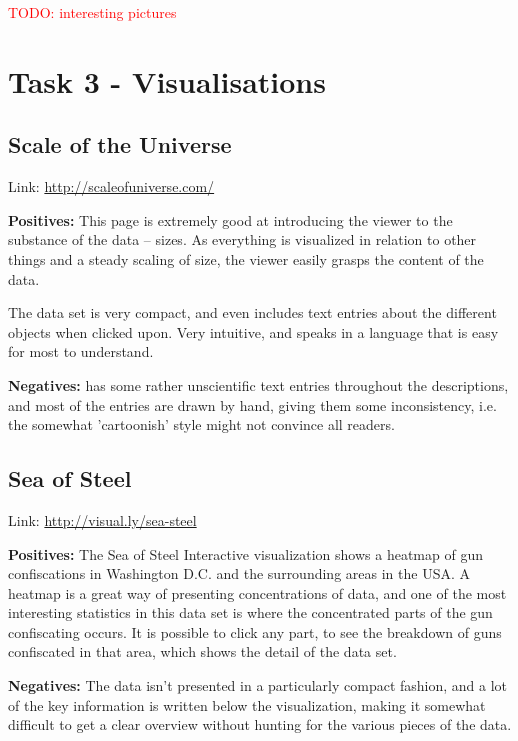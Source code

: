 \documentclass[a4paper]{article}
\newcommand\todo[1]{{\Huge \textcolor{red}{TODO: #1}}}
\begin{document}
\todo{interesting pictures}

\section*{Task 3 - Visualisations}

\subsection*{Scale of the Universe}

Link: \url{http://scaleofuniverse.com/}

\vspace{1em}
\noindent
\textbf{Positives:}
This page is extremely good at introducing the viewer to the substance of the data -- sizes. As everything is visualized in relation to other things and a steady scaling of size, the viewer easily grasps the content of the data.

The data set is very compact, and even includes text entries about the different objects when clicked upon. Very intuitive, and speaks in a language that is easy for most to understand.

\vspace{1em}
\noindent
\textbf{Negatives:} has some rather unscientific text entries throughout the descriptions,
and most of the entries are drawn by hand, giving them some inconsistency, i.e. the somewhat 'cartoonish' style might not convince all readers.

\subsection*{Sea of Steel}

Link: \url{http://visual.ly/sea-steel}

\vspace{1em}
\noindent
\textbf{Positives:} The Sea of Steel Interactive visualization shows a heatmap of gun confiscations in Washington D.C. and the surrounding areas in the USA.
A heatmap is a great way of presenting concentrations of data, and one of the most interesting statistics in this data set is where the concentrated parts of the gun confiscating occurs.
It is possible to click any part, to see the breakdown of guns confiscated in that area, which shows the detail of the data set.

\vspace{1em}
\noindent
\textbf{Negatives:}
The data isn't presented in a particularly compact fashion, and a lot of the key information is written below the visualization, making it somewhat difficult to get a clear overview without hunting for the various pieces of the data.
\end{document}
